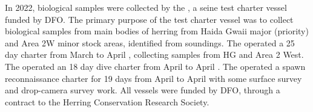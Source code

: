 In 2022, biological samples were collected by the ,
a seine test charter vessel funded by DFO.
The primary purpose of the test charter vessel was to
collect biological samples from main bodies of herring
from Haida Gwaii major (priority) and Area 2W minor stock areas,
identified from soundings.
The  operated a 25 day charter
from March  to April ,
collecting samples from HG and Area 2 West.
The  operated an 18 day dive charter
from April  to April .
The  operated a spawn reconnaissance charter
for 19 days from April  to April 
with some surface survey and drop-camera survey work.
All vessels were funded by DFO, through a contract to the Herring Conservation Research Society.

